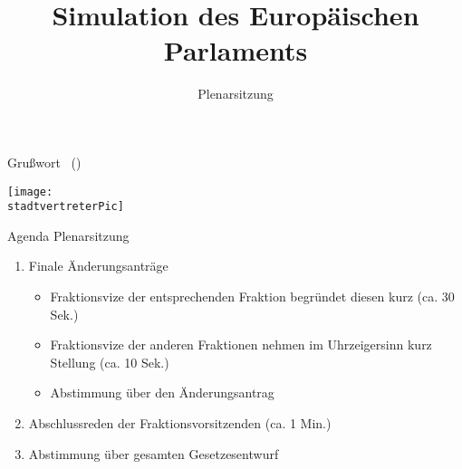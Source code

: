 \documentclass{beamer}
\title{Simulation des Europäischen Parlaments}
\subtitle{Plenarsitzung}
\begin{document}
\frame{\titlepage}

\begin{frame}{Grußwort \stadtvertreter\ (\stadtvertreterOffice)}
\vspace{-1.5cm}
    \begin{center}
        \texttt{[image: \\stadtvertreterPic]}
    \end{center}
\end{frame}

\begin{frame}{Agenda Plenarsitzung}
\vspace{-1.5cm}
    \begin{enumerate}
        \item Finale Änderungsanträge
        \begin{itemize}
            \item Fraktionsvize der entsprechenden Fraktion begründet diesen kurz (ca. 30 Sek.)
            \item Fraktionsvize der anderen Fraktionen nehmen im Uhrzeigersinn kurz Stellung (ca. 10 Sek.)
            \item Abstimmung über den Änderungsantrag
        \end{itemize}
        \item Abschlussreden der Fraktionsvorsitzenden (ca. 1 Min.)
        \item Abstimmung über gesamten Gesetzesentwurf
    \end{enumerate}
\end{frame}
\end{document}
